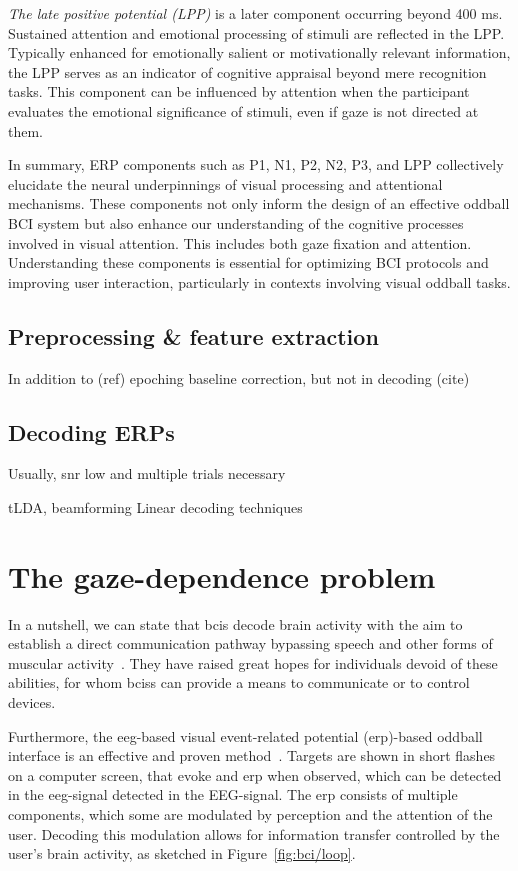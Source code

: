 \emph{The late positive potential (LPP)} is a later component occurring beyond 400 ms.
Sustained attention and emotional processing of stimuli are reflected in the
LPP.
Typically enhanced for emotionally salient or motivationally relevant
information, the LPP serves as an indicator of cognitive appraisal beyond mere
recognition tasks.
This component can be influenced by attention when the participant evaluates
the emotional significance of stimuli, even if gaze is not directed at them.

In summary, ERP components such as P1, N1, P2, N2, P3, and LPP collectively
elucidate the neural underpinnings of visual processing and attentional
mechanisms.
These components not only inform the design of an effective oddball BCI system
but also enhance our understanding of the cognitive processes involved in visual
attention.
This includes both gaze fixation and attention.
Understanding these components is essential for optimizing BCI protocols and
improving user interaction, particularly in contexts involving visual oddball
tasks.

\subsection{Preprocessing \& feature extraction}
In addition to (ref) epoching
baseline correction, but not in decoding (cite)


\subsection{Decoding ERPs}

Usually, snr low and multiple trials necessary

tLDA, beamforming
Linear decoding techniques



\section{The gaze-dependence problem}

In a nutshell, we can state that \acp{bci} decode brain activity with the aim to
establish a direct communication pathway bypassing speech and other forms of
muscular activity~\cite{Naci2012,Chaudhary2016}.
They have raised great hopes for individuals devoid of these abilities, for whom
\acp{bci}s can provide a means to communicate or to
control devices.

Furthermore, the \ac{eeg}-based visual event-related potential (\ac{erp})-based
oddball interface is an effective and proven method~\cite{Wolpaw2018,Severens2020}.
Targets are shown in short flashes on a computer screen, that evoke
and \ac{erp} when observed, which can be detected in the \ac{eeg}-signal
detected in the EEG-signal.
The \ac{erp} consists of multiple components, which some are modulated by
perception and the attention of the user.
Decoding this modulation allows for information transfer controlled by the
user's brain activity, as sketched in Figure~\ref{fig:bci/loop}.

